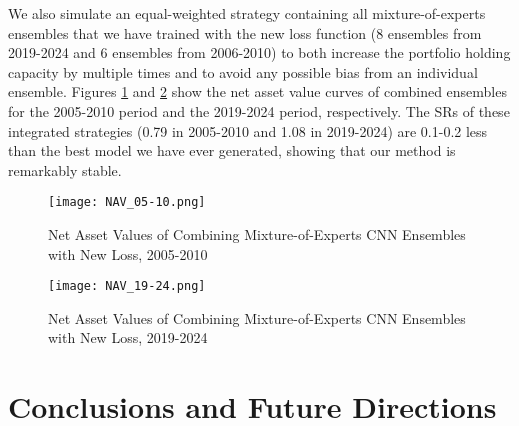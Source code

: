 \documentclass[preprint,12pt,numafflabel,authoryear]{elsarticle}
\begin{document}

We also simulate an equal-weighted strategy containing all mixture-of-experts ensembles that we have trained with the new loss function (8 ensembles from 2019-2024 and 6 ensembles from 2006-2010) to both increase the portfolio holding capacity by multiple times and to avoid any possible bias from an individual ensemble. Figures \ref{fig:NAV_05-10} and \ref{fig:NAV_19-24} show the net asset value curves of combined ensembles for the 2005-2010 period and the 2019-2024 period, respectively. The SRs of these integrated strategies (0.79 in 2005-2010 and 1.08 in 2019-2024) are 0.1-0.2 less than the best model we have ever generated, showing that our method is remarkably stable.

\begin{figure}[htp]
\centering
\texttt{[image: NAV\_05-10.png]}
\caption{Net Asset Values of Combining Mixture-of-Experts CNN Ensembles with New Loss, 2005-2010}
\label{fig:NAV_05-10}
\end{figure}

\begin{figure}[htp]
\centering
\texttt{[image: NAV\_19-24.png]}
\caption{Net Asset Values of Combining Mixture-of-Experts CNN Ensembles with New Loss, 2019-2024}
\label{fig:NAV_19-24}
\end{figure}

\section{Conclusions and Future Directions}
\label{sec:Conclusions}
\end{document}
